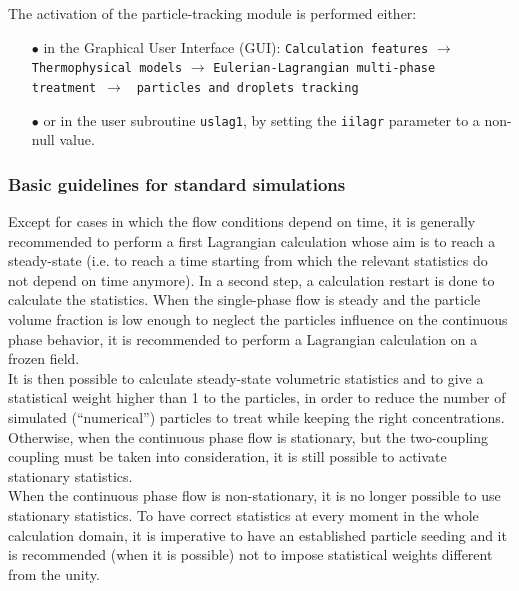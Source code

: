 {{The activation of the particle-tracking module is performed either:
%
\begin{itemize}
 \item [$\bullet$] in the Graphical User Interface (GUI): \texttt{Calculation features} $\rightarrow$ \texttt{Thermophysical models} $\rightarrow$ \texttt{Eulerian-Lagrangian multi-phase treatment}~$\rightarrow$ ~\texttt{particles and droplets tracking}
 \item [$\bullet$] or in the user subroutine \texttt{uslag1}, by setting the \texttt{iilagr} parameter to a non-null value. 
\end{itemize}

\subsubsection{Basic guidelines for standard simulations}
                                                                                                                       
Except for cases in which the flow conditions depend on time, it is generally recommended to perform a first Lagrangian calculation whose aim is to reach a steady-state (i.e. to reach a time starting from which the relevant statistics do not depend on time anymore). In a second step, a calculation restart is done to calculate the statistics. When the single-phase flow is steady and the particle volume fraction is low enough to neglect the particles influence on the continuous phase behavior, it is recommended to perform a Lagrangian calculation on a frozen field.\\

It is then possible to calculate steady-state volumetric statistics and to give a statistical weight higher than 1 to the particles, in order to reduce the number of simulated (``numerical'') particles to treat while keeping the right concentrations. Otherwise, when the continuous phase flow is stationary, but the two-coupling coupling must be taken into consideration, it is still possible to activate stationary statistics. \\                                                                                                                                                                                                                   
When the continuous phase flow is non-stationary, it is no longer possible to use stationary statistics. To have correct statistics at every moment in the whole calculation domain, it is imperative to have an established particle seeding and it is recommended (when it is possible) not to impose statistical weights different from the unity. \\

}}
